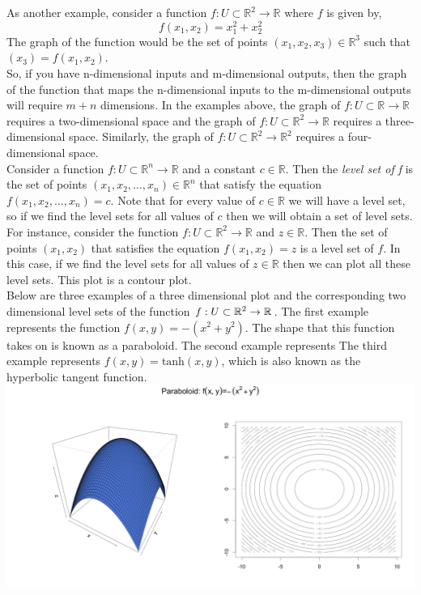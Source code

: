 \documentclass[12pt]{article}
\begin{document}
 As another example, consider a function $f:U\subset\mathbb{R}^2\rightarrow\mathbb{R}$ where $f$ is given by,
\[
f(x_1,x_2) = x_1^2 + x_2^2
\]
  The graph of the function would be the set of points $(x_1,x_2,x_3)\in\mathbb{R}^3$ such that $(x_3) = f(x_1,x_2)$. \\
 
  So, if you have n-dimensional inputs and m-dimensional outputs, then the graph of the function that maps the n-dimensional inputs to the m-dimensional outputs will require $m+n$ dimensions. In the examples above, the graph of $f:U\subset\mathbb{R}\rightarrow\mathbb{R}$ requires a two-dimensional space and the graph of $f:U\subset\mathbb{R}^2\rightarrow\mathbb{R}$ requires a three-dimensional space. Similarly, the graph of $f:U\subset\mathbb{R}^2\rightarrow\mathbb{R}^2$ requires a four-dimensional space. \\
 
 Consider a function $f: U\subset\mathbb{R}^n\rightarrow\mathbb{R}$ and a constant $c\in\mathbb{R}$. Then the \emph{level set of f} is the set of points $(x_1,x_2,\ldots,x_n)\in\mathbb{R}^n$ that satisfy the equation $f(x_1,x_2,\ldots,x_n)=c$. Note that for every value of $c\in\mathbb{R}$ we will have a level set, so if we find the level sets for all values of $c$ then we will obtain a set of level sets. \\

 For instance, consider the function $f:U\subset\mathbb{R}^2\rightarrow\mathbb{R}$ and $z\in\mathbb{R}$. Then the set of points $(x_1,x_2)$ that satisfies the equation $f(x_1,x_2)=z$ is a level set of $f$. In this case, if we find the level sets for all values of $z\in\mathbb{R}$ then we can plot all these level sets. This plot is a contour plot. \\

 Below are three examples of a three dimensional plot and the corresponding two dimensional level sets of the function $f:U\subset\mathbb{R}^2\rightarrow \mathbb{R}$. The first example represents the function $f(x,y)=-(x^2+y^2)$. The shape that this function takes on is known as a paraboloid. The second example represents  The third example represents $f(x,y)=\mbox{tanh}(x,y)$, which is also known as the hyperbolic tangent function. \\

\indent\includegraphics[scale=0.2]{paraboloid_3d.png}
\end{document}
